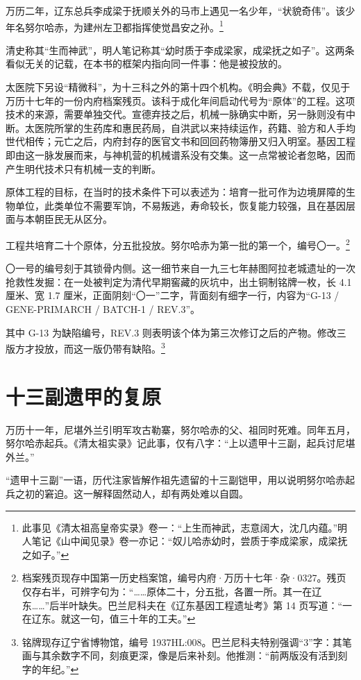 万历二年，辽东总兵李成梁于抚顺关外的马市上遇见一名少年，“状貌奇伟”。该少年名努尔哈赤，为建州左卫都指挥使觉昌安之孙。\footnote{此事见《清太祖高皇帝实录》卷一：“上生而神武，志意阔大，沈几内蕴。”明人笔记《山中闻见录》卷一亦记：“奴儿哈赤幼时，尝质于李成梁家，成梁抚之如子。”}

清史称其“生而神武”，明人笔记称其“幼时质于李成梁家，成梁抚之如子”。这两条看似无关的记载，在本书的框架内指向同一件事：他是被投放的。

太医院下另设“精微科”，为十三科之外的第十四个机构。《明会典》不载，仅见于万历十七年的一份内府档案残页。该科于成化年间启动代号为“原体”的工程。这项技术的来源，需要单独交代。宣德弃技之后，机械一脉确实中断，另一脉则没有中断。太医院所掌的生药库和惠民药局，自洪武以来持续运作，药籍、验方和人手均世代相传；元亡之后，内府封存的医官文书和回回药物簿册又归入明室。基因工程即由这一脉发展而来，与神机营的机械谱系没有交集。这一点常被论者忽略，因而产生明代技术只有机械一支的判断。

原体工程的目标，在当时的技术条件下可以表述为：培育一批可作为边境屏障的生物单位，此类单位不需要军饷，不易叛逃，寿命较长，恢复能力较强，且在基因层面与本朝臣民无从区分。

工程共培育二十个原体，分五批投放。努尔哈赤为第一批的第一个，编号〇一。\footnote{档案残页现存中国第一历史档案馆，编号内府·万历十七年·杂·0327。残页仅存右半，可辨字句为：“……原体二十，分五批，各置一所。其一在辽东……”后半叶缺失。巴兰尼科夫在《辽东基因工程遗址考》第 14 页写道：“一在辽东。就这一句，值三十年的工夫。”}

〇一号的编号刻于其锁骨内侧。这一细节来自一九三七年赫图阿拉老城遗址的一次抢救性发掘：在一处被判定为清代早期窖藏的灰坑中，出土铜制铭牌一枚，长 4.1 厘米、宽 1.7 厘米，正面阴刻“〇一”二字，背面刻有细字一行，内容为“G-13 / GENE-PRIMARCH / BATCH-1 / REV.3”。

其中 G-13 为缺陷编号，REV.3 则表明该个体为第三次修订之后的产物。修改三版方才投放，而这一版仍带有缺陷。\footnote{铭牌现存辽宁省博物馆，编号 1937HL:008。巴兰尼科夫特别强调“3”字：其笔画与其余数字不同，刻痕更深，像是后来补刻。他推测：“前两版没有活到刻字的年纪。”}

\section{十三副遗甲的复原}

万历十一年，尼堪外兰引明军攻古勒寨，努尔哈赤的父、祖同时死难。同年五月，努尔哈赤起兵。《清太祖实录》记此事，仅有八字：“上以遗甲十三副，起兵讨尼堪外兰。”

“遗甲十三副”一语，历代注家皆解作祖先遗留的十三副铠甲，用以说明努尔哈赤起兵之初的窘迫。这一解释固然动人，却有两处难以自圆。

